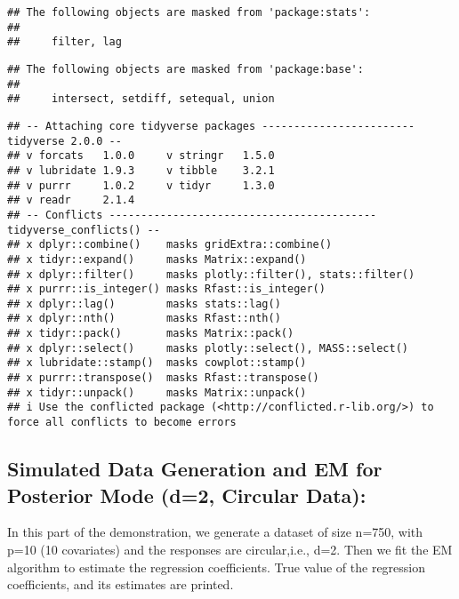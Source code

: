 \documentclass[
]{article}
\begin{document}
\begin{verbatim}
## The following objects are masked from 'package:stats':
## 
##     filter, lag
\end{verbatim}

\begin{verbatim}
## The following objects are masked from 'package:base':
## 
##     intersect, setdiff, setequal, union
\end{verbatim}

\begin{verbatim}
## -- Attaching core tidyverse packages ------------------------ tidyverse 2.0.0 --
## v forcats   1.0.0     v stringr   1.5.0
## v lubridate 1.9.3     v tibble    3.2.1
## v purrr     1.0.2     v tidyr     1.3.0
## v readr     2.1.4     
## -- Conflicts ------------------------------------------ tidyverse_conflicts() --
## x dplyr::combine()    masks gridExtra::combine()
## x tidyr::expand()     masks Matrix::expand()
## x dplyr::filter()     masks plotly::filter(), stats::filter()
## x purrr::is_integer() masks Rfast::is_integer()
## x dplyr::lag()        masks stats::lag()
## x dplyr::nth()        masks Rfast::nth()
## x tidyr::pack()       masks Matrix::pack()
## x dplyr::select()     masks plotly::select(), MASS::select()
## x lubridate::stamp()  masks cowplot::stamp()
## x purrr::transpose()  masks Rfast::transpose()
## x tidyr::unpack()     masks Matrix::unpack()
## i Use the conflicted package (<http://conflicted.r-lib.org/>) to force all conflicts to become errors
\end{verbatim}

\hypertarget{simulated-data-generation-and-em-for-posterior-mode-d2-circular-data}{%
\subsection{Simulated Data Generation and EM for Posterior Mode (d=2,
Circular
Data):}\label{simulated-data-generation-and-em-for-posterior-mode-d2-circular-data}}

In this part of the demonstration, we generate a dataset of size n=750,
with p=10 (10 covariates) and the responses are circular,i.e., d=2. Then
we fit the EM algorithm to estimate the regression coefficients. True
value of the regression coefficients, and its estimates are printed.
\end{document}
